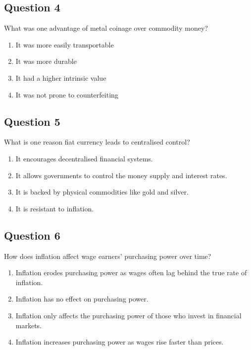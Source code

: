 \documentclass[12pt,a4paper]{article}
\begin{document}
\bigskip


\subsection*{Question 4}
What was one advantage of metal coinage over commodity money?

\begin{enumerate}[label=\Alph*., leftmargin=*]
\item It was more easily transportable
\item It was more durable
\item It had a higher intrinsic value
\item It was not prone to counterfeiting
\end{enumerate}

\bigskip


\subsection*{Question 5}
What is one reason fiat currency leads to centralised control?

\begin{enumerate}[label=\Alph*., leftmargin=*]
\item It encourages decentralised financial systems.
\item It allows governments to control the money supply and interest rates.
\item It is backed by physical commodities like gold and silver.
\item It is resistant to inflation.
\end{enumerate}

\bigskip


\subsection*{Question 6}
How does inflation affect wage earners' purchasing power over time?

\begin{enumerate}[label=\Alph*., leftmargin=*]
\item Inflation erodes purchasing power as wages often lag behind the true rate of inflation.
\item Inflation has no effect on purchasing power.
\item Inflation only affects the purchasing power of those who invest in financial markets.
\item Inflation increases purchasing power as wages rise faster than prices.
\end{enumerate}
\end{document}

